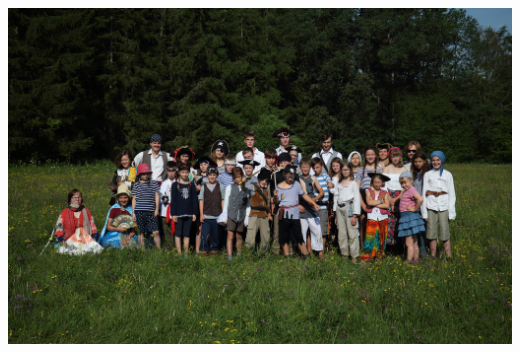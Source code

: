 
\begin{center}
	\includegraphics[width=\textwidth]{img/anpetu_tabor/spolecna.JPG}
\end{center}
\clearpage